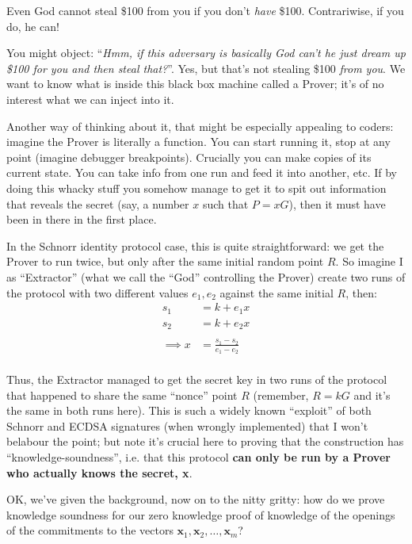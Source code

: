 \documentclass[10pt,a4paper]{article}
\begin{document}
Even God cannot steal \$100 from you if you don't \emph{have} \$100.
Contrariwise, if you do, he can!

You might object: ``\emph{Hmm, if this adversary is basically God can't
he just dream up \$100 for you and then steal that?}''. Yes, but that's
not stealing \$100 \emph{from you}. We want to know what is inside this
black box machine called a Prover; it's of no interest what we can
inject into it.

Another way of thinking about it, that might be especially appealing to
coders: imagine the Prover is literally a function. You can start
running it, stop at any point (imagine debugger breakpoints). Crucially
you can make copies of its current state. You can take info from one run
and feed it into another, etc. If by doing this whacky stuff you somehow
manage to get it to spit out information that reveals the secret (say, a
number $x$ such that $P=xG$), then it must have been in there in the first place.

In the Schnorr identity protocol case, this is quite straightforward: we
get the Prover to run twice, but only after the same initial random
point $R$. So imagine I as ``Extractor'' (what we call the ``God''
controlling the Prover) create two runs of the protocol with two
different values $e_1, e_2$ against the same initial $R$, then:
\begin{align*}
            s_1 & = k + e_{1}x \\
            s_2 & = k + e_{2}x \\
            \\
\implies    x   & = \frac{s_1 - s_2}{e_1 - e_2} \\
\end{align*}

Thus, the Extractor managed to get the secret key in two runs of the
protocol that happened to share the same ``nonce'' point $R$ (remember, $R=kG$ and
it's the same in both runs here). This is such a widely known
``exploit'' of both Schnorr and ECDSA signatures (when wrongly
implemented) that I won't belabour the point; but note it's crucial here
to proving that the construction has ``knowledge-soundness'', i.e. that
this protocol \textbf{can only be run by a Prover who actually knows the
secret, x}.

OK, we've given the background, now on to the nitty gritty: how do we
prove knowledge soundness for our zero knowledge proof of knowledge of
the openings of the commitments to the vectors $\mathbf{x}_1, \mathbf{x}_2, \ldots, \mathbf{x}_m$?
\end{document}
